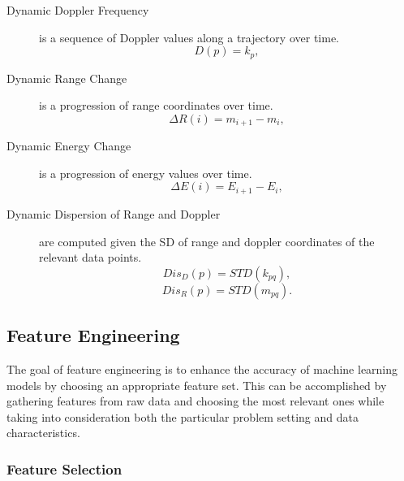 \begin{description}

    \item[Dynamic Doppler Frequency] is a sequence of Doppler values along a trajectory over time.
    \begin{equation} \label{eq:dynamicDopplerFreq_ft}
     D (p) = k_p,
    \end{equation}
    
    \item[Dynamic Range Change] is a progression of range coordinates over time.
    \begin{equation} \label{eq:dynamicRangeChange_ft}
     \Delta R(i) = m_{i+1} - m_i,
    \end{equation}

    \item[Dynamic Energy Change] is a progression of energy values over time.
    \begin{equation} \label{eq:dynamicEnergyCh_ft}
     \Delta E(i) = E_{i+1} - E_i,
    \end{equation}
         
    \item[Dynamic Dispersion of Range and Doppler] are computed given the \gls{SD} of range and doppler coordinates of the relevant data points.
    \begin{equation} \label{eq:dynamicDispersionRange_ft}
     Dis_D(p) = STD(k_{pq}),
    \end{equation}
    \begin{equation} \label{eq:dynamicDispersionDoppler_ft}
     Dis_R(p) = STD(m_{pq}).
    \end{equation}
    
\end{description}



\subsection{Feature Engineering}
\label{subsec:featureEngineering}

The goal of feature engineering is to enhance the accuracy of machine learning models by choosing an appropriate feature set. This can be accomplished by gathering features from raw data and choosing the most relevant ones while taking into consideration both the particular problem setting and data characteristics.

\subsubsection{Feature Selection}
\label{subsec:featureSelection}

